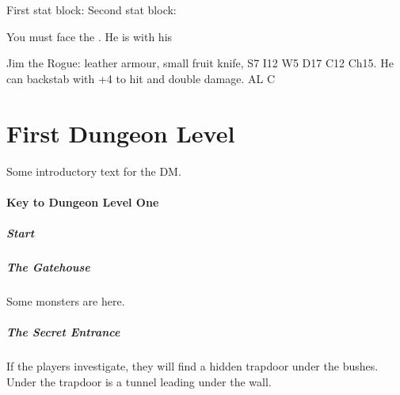 \documentclass[a4paper]{module}
\begin{document}
First stat block:
Second stat block:

You must face the . 
He is with his 




\begin{statblockfreestyle}
Jim the Rogue: leather armour, small fruit knife, S7 I12 W5 D17 C12 Ch15. He can backstab with +4 to hit and double damage. AL C
\end{statblockfreestyle}


\part{First Dungeon Level}

Some introductory text for the DM.

\subsection{Key to Dungeon Level One}

\subsubsection*{Start}


\subsubsection{The Gatehouse}


Some monsters are here.

\subsubsection{The Secret Entrance}


If the players investigate, they will find a hidden trapdoor under the bushes. Under the trapdoor is a tunnel leading under the wall.
\end{document}
